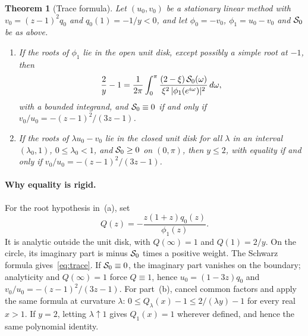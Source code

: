 \documentclass[11pt]{article}
\newtheorem{theorem}{Theorem}[section]
\theoremstyle{definition}
\theoremstyle{remark}
\begin{document}
\begin{theorem}[Trace formula]\label{thm:trace}
Let \((u_0,v_0)\) be a stationary linear method with \(v_0=(z-1)^2q_0\) and \(q_0(1)=-1/y<0\), and let
\(\phi_0=-v_0\), \(\phi_1=u_0-v_0\) and \(\mathcal S_0\) be as above.
\begin{enumerate}[label=\textup{(\alph*)}]
\item If the roots of \(\phi_1\) lie in the open unit disk, except possibly a simple root at \(-1\), then
\begin{equation}\label{eq:trace}
\frac2y-1=\frac1{2\pi}\int_0^\pi\frac{(2-\xi)\,\mathcal S_0(\omega)}{\xi^2\,|\phi_1(e^{i\omega})|^2}\,d\omega ,
\end{equation}
with a bounded integrand, and \(\mathcal S_0\equiv0\) if and only if \(v_0/u_0=-(z-1)^2/(3z-1)\).
\item If the roots of \(\lambda u_0-v_0\) lie in the closed unit disk for all \(\lambda\) in an interval \((\lambda_0,1)\), \(0\le\lambda_0<1\), and
\(\mathcal S_0\ge0\) on \((0,\pi)\), then \(y\le2\), with equality if and only if \(v_0/u_0=-(z-1)^2/(3z-1)\).
\end{enumerate}
\end{theorem}

\paragraph{Why equality is rigid.}
For the root hypothesis in~(a), set
\[
Q(z)=-\frac{z(1+z)q_0(z)}{\phi_1(z)}.
\]
It is analytic outside the unit disk, with \(Q(\infty)=1\) and \(Q(1)=2/y\).
On the circle, its imaginary part is minus \(\mathcal S_0\) times a positive weight.
The Schwarz formula gives~\eqref{eq:trace}.  If \(\mathcal S_0\equiv0\), the imaginary part vanishes on the boundary;
analyticity and \(Q(\infty)=1\) force \(Q\equiv1\), hence
\(u_0=(1-3z)q_0\) and \(v_0/u_0=-(z-1)^2/(3z-1)\).
For part~(b), cancel common factors and apply the same formula at curvature \(\lambda\):
\(0\le Q_\lambda(x)-1\le2/(\lambda y)-1\) for every real \(x>1\).
If \(y=2\), letting \(\lambda\uparrow1\) gives \(Q_1(x)=1\) wherever defined,
and hence the same polynomial identity.
\end{document}
